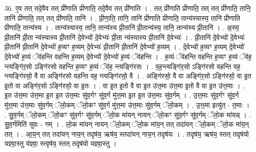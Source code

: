 \documentclass[17pt]{extarticle}
\begin{document}
36. ए॒व तत् तदे॒वैव तत् प्री॑णाति प्रीणाति॒ तदे॒वैव तत् प्री॑णाति । . तत् प्री॑णाति प्रीणाति॒ तत् तत् प्री॑णाति॒ तानि॒ तानि॑ प्रीणाति॒ तत् तत् प्री॑णाति॒ तानि॑ । . प्री॒णा॒ति॒ तानि॒ तानि॑ प्रीणाति प्रीणाति॒ तान्य॑स्यास्य॒ तानि॑ प्रीणाति प्रीणाति॒ तान्य॑स्य । . तान्य॑स्यास्य॒ तानि॒ तान्य॑स्य प्री॒तानि॑ प्री॒तान्य॑स्य॒ तानि॒ तान्य॑स्य प्री॒तानि॑ । . अ॒स्य॒ प्री॒तानि॑ प्री॒ता न्य॑स्यास्य प्री॒तानि॑ दे॒वेभ्यो॑ दे॒वेभ्यः॑ प्री॒ता न्य॑स्यास्य प्री॒तानि॑ दे॒वेभ्यः॑ । . प्री॒तानि॑ दे॒वेभ्यो॑ दे॒वेभ्यः॑ प्री॒तानि॑ प्री॒तानि॑ दे॒वेभ्यो॑ ह॒व्यꣳ ह॒व्यम् दे॒वेभ्यः॑ प्री॒तानि॑ प्री॒तानि॑ दे॒वेभ्यो॑ ह॒व्यम् । . दे॒वेभ्यो॑ ह॒व्यꣳ ह॒व्यम् दे॒वेभ्यो॑ दे॒वेभ्यो॑ ह॒व्यं ॅव॑हन्ति वहन्ति ह॒व्यम् दे॒वेभ्यो॑ दे॒वेभ्यो॑ ह॒व्यं ॅव॑हन्ति । . ह॒व्यं ॅव॑हन्ति वहन्ति ह॒व्यꣳ ह॒व्यं ॅव॑ह॒ न्त्यङ्गि॑र॒सो ऽङ्गि॑रसो वहन्ति ह॒व्यꣳ ह॒व्यं ॅव॑ह॒ न्त्यङ्गि॑रसः । . व॒ह॒न्त्यङ्गि॑र॒सो ऽङ्गि॑रसो वहन्ति वह॒ न्त्यङ्गि॑रसो॒ वै वा अङ्गि॑रसो वहन्ति वह॒ न्त्यङ्गि॑रसो॒ वै । . अङ्गि॑रसो॒ वै वा अङ्गि॑र॒सो ऽङ्गि॑रसो॒ वा इ॒त इ॒तो वा अङ्गि॑र॒सो ऽङ्गि॑रसो॒ वा इ॒तः । . वा इ॒त इ॒तो वै वा इ॒त उ॑त्त॒मा उ॑त्त॒मा इ॒तो वै वा इ॒त उ॑त्त॒माः । . इ॒त उ॑त्त॒मा उ॑त्त॒मा इ॒त इ॒त उ॑त्त॒माः सु॑व॒र्गꣳ सु॑व॒र्ग मु॑त्त॒मा इ॒त इ॒त उ॑त्त॒माः सु॑व॒र्गम् । . उ॒त्त॒माः सु॑व॒र्गꣳ सु॑व॒र्ग मु॑त्त॒मा उ॑त्त॒माः सु॑व॒र्गम् ॅलो॒कम् ॅलो॒कꣳ सु॑व॒र्ग मु॑त्त॒मा उ॑त्त॒माः सु॑व॒र्गम् ॅलो॒कम् । . उ॒त्त॒मा इत्यु॑त् - त॒माः । . सु॒व॒र्गम् ॅलो॒कम् ॅलो॒कꣳ सु॑व॒र्गꣳ सु॑व॒र्गम् ॅलो॒क मा॑यन् नायन् ॅलो॒कꣳ सु॑व॒र्गꣳ सु॑व॒र्गम् ॅलो॒क मा॑यन्न् । . सु॒व॒र्गमिति॑ सुवः - गम् । . लो॒क मा॑यन् नायन् ॅलो॒कम् ॅलो॒क मा॑य॒न् तत् तदा॑यन् ॅलो॒कम् ॅलो॒क मा॑य॒न् तत् । . आ॒य॒न् तत् तदा॑यन् नाय॒न् तदृष॑य॒ ऋष॑य॒ स्तदा॑यन् नाय॒न् तदृष॑यः । . तदृष॑य॒ ऋष॑य॒ स्तत् तदृष॑यो यज्ञ्वा॒स्तु य॑ज्ञ्वा॒ स्त्वृष॑य॒ स्तत् तदृष॑यो यज्ञ्वा॒स्तु । \newline
\end{document}

